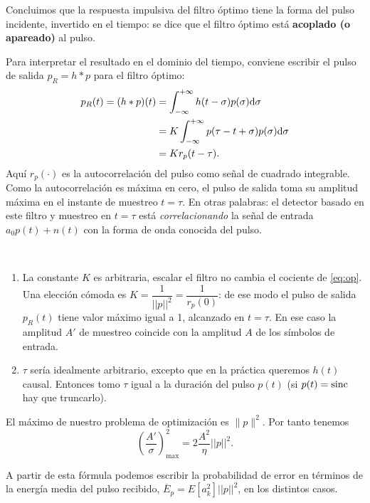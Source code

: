 Concluimos que la respuesta impulsiva del filtro óptimo tiene la
forma del pulso incidente, invertido en el tiempo: se dice que el
filtro óptimo está {\bf acoplado (o apareado)}  al pulso.

Para interpretar el resultado en el dominio del tiempo, conviene
escribir el pulso de salida $p_R =h\ast p$ para el filtro
óptimo:
\begin{align*}
            p_R(t) = (h\ast p) (t)  & = \int_{-\infty}^{+\infty}
h(t-\sigma) p (\sigma)\mathrm{d} \sigma\\
                        & =
K \int_{-\infty}^{+\infty} p(\tau - t + \sigma) p (\sigma)\mathrm{d}
\sigma \\ & = K r_p(t - \tau).
        \end{align*}
Aquí $r_p(\cdot)$ es la autocorrelación del pulso como señal de
cuadrado integrable. Como la autocorrelación es máxima en cero, el
pulso de salida toma su amplitud máxima en el instante de muestreo
$t=\tau$. En otras palabras: el detector basado en este filtro y
muestreo en $t=\tau$ está {\em correlacionando} la señal de
entrada $a_0 p(t) + n(t)$ con la forma de onda conocida del pulso.


\begin{remarksSN}
    $\phantom{1}$
    \begin{enumerate}
        \item La constante $K$ es arbitraria, escalar el filtro no
        cambia el cociente de \eqref{eq:op}. Una elección cómoda es
$K=\dfrac{1}{||p||^2}=\dfrac{1}{r_p(0)}$: de ese modo el pulso de
salida $p_R(t)$ tiene valor máximo igual a 1, alcanzado en
$t=\tau$. En ese caso la amplitud $A'$ de muestreo coincide con la
amplitud $A$ de los símbolos de entrada.
        \item $\tau$ sería idealmente arbitrario, excepto que en la
práctica queremos $h(t)$ causal. Entonces tomo $\tau$ igual a la
duración del pulso $p(t)$ (si $p(t)=\operatorname{sinc}$ hay que truncarlo).
    \end{enumerate}
\end{remarksSN}

El máximo de nuestro problema de optimización es $\|p\|^2$. Por
tanto tenemos
\[
\left(\dfrac{A'}{\sigma}\right)^2_{\text{max}} = 2
\frac{A^2}{\eta} ||p||^2.\]

A partir de esta fórmula podemos escribir la probabilidad de error
en términos de la energía media del pulso recibido,
$\overline{E}_p = E[a_k^2] ||p||^2$, en los distintos casos.

